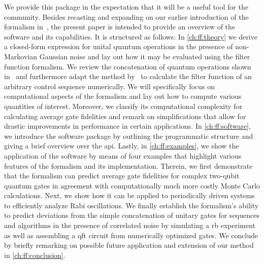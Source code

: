 We provide this package in the expectation that it will be a useful tool for the community.
Besides recasting and expanding on our earlier introduction of the formalism in~, the present paper is intended to provide an overview of the software and its capabilities.
It is structured as follows: In \cref{ch:ff:theory} we derive a closed-form expression for unital quantum operations in the presence of non-Markovian Gaussian noise and lay out how it may be evaluated using the filter function formalism.
We review the concatenation of quantum operations shown in~ and furthermore adapt the method by~\citet{Green2013} to calculate the filter function of an arbitrary control sequence numerically.
We will specifically focus on computational aspects of the formalism and lay out how to compute various quantities of interest.
Moreover, we classify its computational complexity for calculating average gate fidelities and remark on simplifications that allow for drastic improvements in performance in certain applications.
In \cref{ch:ff:software}, we introduce the software package by outlining the programmatic structure and giving a brief overview over the \gls{api}.
Lastly, in \cref{ch:ff:examples}, we show the application of the software by means of four examples that highlight various features of the formalism and its implementation.
Therein, we first demonstrate that the formalism can predict average gate fidelities for complex two-qubit quantum gates in agreement with computationally much more costly Monte Carlo calculations.
Next, we show how it can be applied to periodically driven systems to efficiently analyze Rabi oscillations.
We finally establish the formalism's ability to predict deviations from the simple concatenation of unitary gates for sequences and algorithms in the presence of correlated noise by simulating a \gls{rb} experiment as well as assembling a \gls{qft} circuit from numerically optimized gates.
We conclude by briefly remarking on possible future application and extension of our method in \cref{ch:ff:conclusion}.

